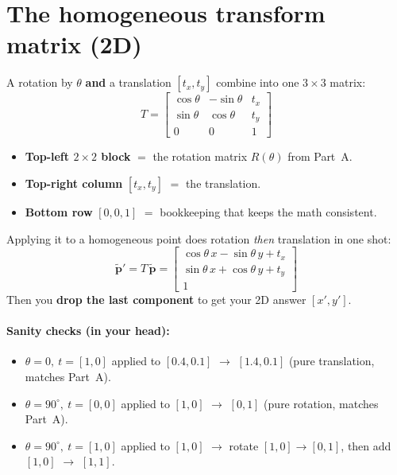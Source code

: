 \documentclass[11pt]{article}
\begin{document}
\section{The homogeneous transform matrix (2D)}

A rotation by $\theta$ \textbf{and} a translation $[t_x, t_y]$ combine into one
$3\times 3$ matrix:
\[
  T = \begin{bmatrix}
    \cos\theta & -\sin\theta & t_x \\
    \sin\theta & \cos\theta  & t_y \\
    0 & 0 & 1
  \end{bmatrix}
\]
\begin{itemize}[leftmargin=*]
  \item \textbf{Top-left $2\times 2$ block} $=$ the rotation matrix $R(\theta)$
  from Part~A.
  \item \textbf{Top-right column} $[t_x, t_y]$ $=$ the translation.
  \item \textbf{Bottom row} $[0,0,1]$ $=$ bookkeeping that keeps the math
  consistent.
\end{itemize}

Applying it to a homogeneous point does rotation \emph{then} translation in one
shot:
\[
  \tilde{\mathbf{p}}' = T\,\tilde{\mathbf{p}} =
  \begin{bmatrix}
    \cos\theta\,x - \sin\theta\,y + t_x \\
    \sin\theta\,x + \cos\theta\,y + t_y \\
    1
  \end{bmatrix}
\]
Then you \textbf{drop the last component} to get your 2D answer $[x', y']$.

\paragraph{Sanity checks (in your head):}
\begin{itemize}[leftmargin=*]
  \item $\theta=0,\ t=[1,0]$ applied to $[0.4,0.1]$ $\to$ $[1.4,0.1]$ (pure
  translation, matches Part~A).
  \item $\theta=90^\circ,\ t=[0,0]$ applied to $[1,0]$ $\to$ $[0,1]$ (pure
  rotation, matches Part~A).
  \item $\theta=90^\circ,\ t=[1,0]$ applied to $[1,0]$ $\to$ rotate
  $[1,0]{\to}[0,1]$, then add $[1,0]$ $\to$ $[1,1]$.
\end{itemize}
\end{document}
